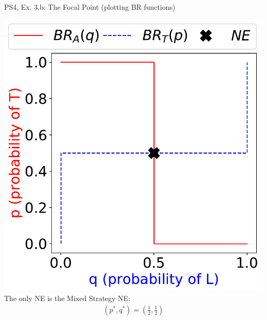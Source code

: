 \begin{frame}{PS4, Ex. 3.b: The Focal Point (plotting BR functions)}
\begin{multicols}{2}
    \vfill\null \columnbreak
    \includegraphics[width=\columnwidth]{figures/3b}
    The only NE is the Mixed Strategy NE:
    \begin{align*}
      (p^{*},q^{*})=\left(\frac{1}{2},\frac{1}{2}\right)
    \end{align*}
  \vfill\null
  \end{multicols}
\end{frame}

